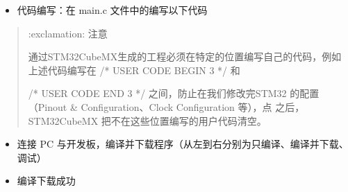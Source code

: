 \documentclass[a4paper,12pt,english]{sphinxmanual}
\begin{document}
\sphinxAtStartPar
{}
\begin{itemize}
\item {} 
\sphinxAtStartPar
代码编写：在 main.c 文件中的编写以下代码

\end{itemize}

\sphinxAtStartPar
{}

\begin{sphinxVerbatim}[commandchars=\\\{\}]

\end{sphinxVerbatim}
\begin{quote}

\sphinxAtStartPar
:exclamation: 注意

\sphinxAtStartPar
通过STM32CubeMX生成的工程必须在特定的位置编写自己的代码，例如上述代码编写在 /* USER CODE BEGIN 3 */  和

\sphinxAtStartPar
/* USER CODE END 3 */ 之间，防止在我们修改完STM32 的配置（Pinout \& Configuration、Clock Configuration 等），点  之后，STM32CubeMX 把不在这些位置编写的用户代码清空。
\end{quote}
\begin{itemize}
\item {} 
\sphinxAtStartPar
连接 PC 与开发板，编译并下载程序（从左到右分别为只编译、编译并下载、调试）

\end{itemize}

\sphinxAtStartPar
{}
\begin{itemize}
\item {} 
\sphinxAtStartPar
编译下载成功

\end{itemize}
\end{document}
